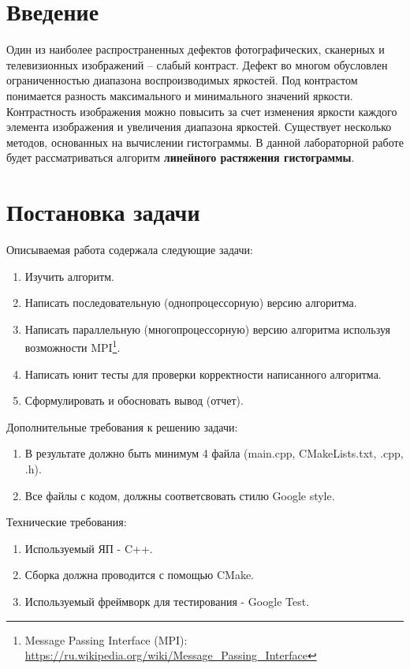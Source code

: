 \documentclass[a4paper,12pt]{article}
\begin{document}
\tableofcontents
\newpage

\section*{Введение}
Один из наиболее распространенных дефектов фотографических, сканерных и телевизионных изображений – слабый контраст. Дефект во многом обусловлен ограниченностью диапазона воспроизводимых яркостей. Под контрастом понимается разность максимального и минимального значений яркости. Контрастность изображения можно повысить за счет изменения яркости каждого элемента изображения и увеличения диапазона яркостей. Существует несколько методов, основанных на вычислении гистограммы. В данной лабораторной работе будет рассматриваться алгоритм \textbf{линейного растяжения гистограммы}.

\section*{Постановка задачи}

Описываемая работа содержала следующие задачи:
\begin{enumerate}
    \item Изучить алгоритм.
    \item Написать последовательную (однопроцессорную) версию алгоритма.
    \item Написать параллельную (многопроцессорную) версию алгоритма используя возможности MPI\footnote{Message Passing Interface (MPI): \url{https://ru.wikipedia.org/wiki/Message_Passing_Interface} }.
    \item Написать юнит тесты для проверки корректности написанного алгоритма.
    \item Сформулировать и обосновать вывод (отчет).
\end{enumerate}

Дополнительные требования к решению задачи:
\begin{enumerate}
     \item В результате должно быть минимум 4 файла (main.cpp, CMakeLists.txt, .cpp, .h).
     \item Все файлы с кодом, должны соответсвовать стилю Google style.
\end{enumerate}

Технические требования:
\begin{enumerate}
    \item Используемый ЯП - C++.
    \item Сборка должна проводится с помощью CMake.
    \item Используемый фреймворк для тестирования - Google Test.
\end{enumerate}
\end{document}
